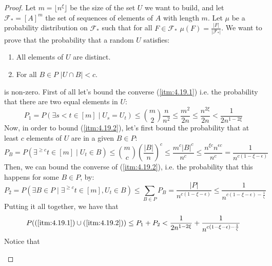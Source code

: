         \begin{proof}
            Let $m = \lfloor n^\xi \rfloor$ be the size of the set $U$ we want to build, and let $\mathcal{F}_* = [A]^m$
            the set of sequences of elements of $A$ with length $m$.
            Let $\mu$ be a probability distribution on $\mathcal{F}_*$ such that for all $F \in \mathcal{F}_*$
            $\mu(F) = \frac{|F|}{|\mathcal{F}_*|}$.
            We want to prove that the probability that a random $U$ satisfies:
            \begin{enumerate}
                \item\label{itm:4.19.1} All elements of $U$ are distinct.
                \item\label{itm:4.19.2} For all $B \in P$ $|U \cap B| < c$.
            \end{enumerate}
            is non-zero.
            First of all let's bound the converse (\ref{itm:4.19.1}) i.e. the probability that there are two equal elements
            in $U$:
            \[
                P_1 = P(\exists s < t \in [m] \mid U_s = U_t)
                    \leq {m \choose 2} \frac{n}{n^2}
                    \leq \frac{m^2}{2n}
                    \leq \frac{n^{2\xi}}{2n}
                    < \frac{1}{2n^{1-2\xi}}
            \]
            Now, in order to bound (\ref{itm:4.19.2}), let's first bound the probability that at least $c$ elements of
            $U$ are in a given $B \in P$:
            \[
                P_B = P(\exists^{\geq c} t\in [m] \mid U_t \in B)
                    \leq {m \choose c} \left( \frac{|B|}{n} \right)^c
                    \leq \frac{m^c |B|^c}{n^c}
                    \leq \frac{n^{\xi c} n^{\epsilon c}}{n^c}
                    = \frac{1}{n^{c (1 - \xi - \epsilon)}}
            \]
            Then, we can bound the converse of (\ref{itm:4.19.2}), i.e. the probability that this happens for some $B \in P$,
            by:
            \[
                P_2 = P(\exists B \in P \mid \exists^{\geq c} t\in [m], U_t \in B)
                    \leq \sum_{B \in P} P_B
                    = \frac{|P|}{n^{c (1 - \xi - \epsilon)}}
                    \leq \frac{1}{n^{c (1 - \xi - \epsilon) - \frac{1}{\zeta}}}
            \]
            Putting it all together, we have that
            \[
                P((\ref{itm:4.19.1}) \cup (\ref{itm:4.19.2}))
                    \leq P_1 + P_2
                    < \frac{1}{2n^{1-2\xi}} + \frac{1}{n^{c (1 - \xi - \epsilon) - \frac{1}{\zeta}}}
            \]
            Notice that
            \begin{itemize}

\end{itemize}
\end{proof}
